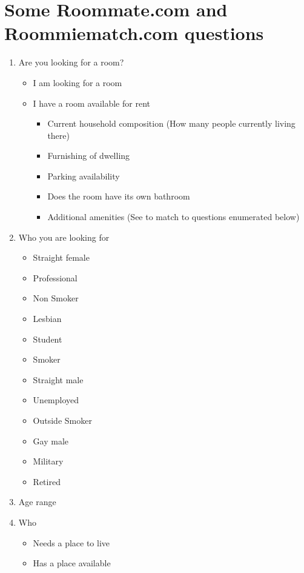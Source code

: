 \documentclass[journal]{./IEEE/IEEEtran}
\begin{document}
\section{Some Roommate.com and Roommiematch.com questions} %
\begin{enumerate}
    \item Are you looking for a room?
    \begin{itemize}
        \item I am looking for a room
        \item I have a room available for rent
        \begin{itemize}
            \item Current household composition (How many people currently living there)
            \item Furnishing of dwelling
            \item Parking availability
            \item Does the room have its own bathroom
            \item Additional amenities (See to match to questions enumerated below)
        \end{itemize}
    \end{itemize}
    \item Who you are looking for
    \begin{itemize}
        \item Straight female
        \item Professional
        \item Non Smoker
        \item Lesbian
        \item Student
        \item Smoker
        \item Straight male
        \item Unemployed
        \item Outside Smoker
        \item Gay male
        \item Military
        \item Retired
    \end{itemize}
    \item Age range
    \item Who
    \begin{itemize}
        \item Needs a place to live
        \item Has a place available

\end{itemize}
\end{enumerate}
\end{document}
